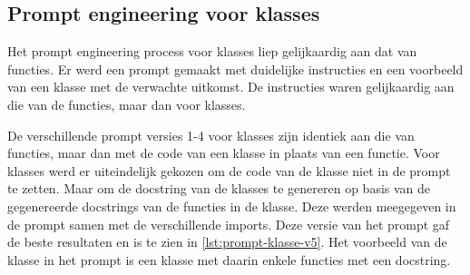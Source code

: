 \subsection{Prompt engineering voor klasses}
Het prompt engineering process voor klasses liep gelijkaardig aan dat van functies.
Er werd een prompt gemaakt met duidelijke instructies en een voorbeeld van een klasse met de verwachte uitkomst.
De instructies waren gelijkaardig aan die van de functies, maar dan voor klasses.

De verschillende prompt versies 1-4 voor klasses zijn identiek aan die van functies, maar dan met de code van een klasse in plaats van een functie.
Voor klasses werd er uiteindelijk gekozen om de code van de klasse niet in de prompt te zetten.
Maar om de docstring van de klasses te genereren op basis van de gegenereerde docstrings van de functies in de klasse.
Deze werden meegegeven in de prompt samen met de verschillende imports.
Deze versie van het prompt gaf de beste resultaten en is te zien in \ref{lst:prompt-klasse-v5}.
Het voorbeeld van de klasse in het prompt is een klasse met daarin enkele functies met een docstring.

